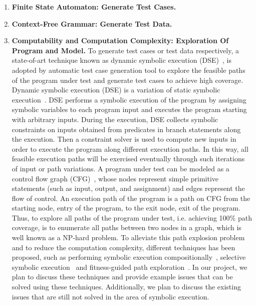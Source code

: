 \documentclass[times, 10pt,onecolumn]{article}
\begin{document}
\begin{enumerate}
\item{\textbf{Finite State Automaton: Generate Test Cases.} 
}

\item{\textbf{Context-Free Grammar: Generate Test Data.} }

\item{\textbf{Computability and Computation Complexity: Exploration Of Program and Model.} To generate test cases or test data respectively, a state-of-art technique known as dynamic symbolic execution (DSE)~\cite{dart,exe,cute}, is adopted by automatic test case generation tool to explore the feasible paths of the program under test and generate test cases to achieve high coverage. Dynamic symbolic execution (DSE) is a variation of static symbolic execution~\cite{static}. DSE performs a symbolic execution of the program by assigning symbolic variables to each program input and executes the program starting with arbitrary inputs. During the execution, DSE collects symbolic constraints on inputs obtained from predicates in branch statements along the execution. Then a constraint solver is used to compute new inputs in order to execute the program along different execution paths. In this way, all feasible execution paths will be exercised eventually through such iterations of input or path variations. A program under test can be modeled as a control flow graph (CFG)~\cite{testbook}, whose nodes represent simple primitive statements (such as input, output, and assignment) and edges represent the flow of control. An execution path of the program is a path on CFG from the starting node, entry of the program, to the exit node, exit of the program. Thus, to explore all paths of the program under test, i.e. achieving 100\% path coverage, is to enumerate all paths between two nodes in a graph, which is well known as a NP-hard problem. To alleviate this path explosion problem and to reduce the computation complexity, different techniques has been proposed, such as performing symbolic execution compositionally~\cite{compositional}, selective symbolic execution~\cite{selective} and fitness-guided path exploration~\cite{fitness}. In our project, we plan to discuss these techniques and provide example issues that can be solved using these techniques. Additionally, we plan to discuss the existing issues that are still not solved in the area of symbolic execution.}
\end{enumerate}



\end{document}
